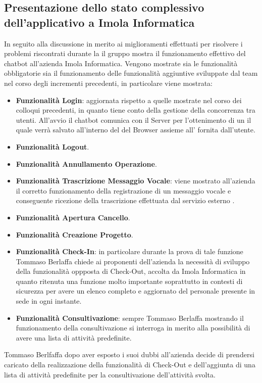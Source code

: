 \newpage
\subsection{Presentazione dello stato complessivo     dell'applicativo a Imola Informatica}
In seguito alla discussione in merito ai miglioramenti effettuati per risolvere i problemi riscontrati durante la  il gruppo mostra il funzionamento effettivo del chatbot all'azienda Imola Informatica. Vengono mostrate sia le funzionalità obbligatorie sia il funzionamento delle funzionalità aggiuntive sviluppate dal team nel corso degli incrementi precedenti, in particolare viene mostrata: 
\begin{itemize}
    \item \textbf{Funzionalità Login}: aggiornata rispetto a quelle mostrate nel corso dei colloqui precedenti, in quanto tiene conto della gestione della concorrenza tra utenti. All'avvio il chatbot comunica con il Server per l'ottenimento di un  il quale verrà salvato all'interno del  del Browser assieme all' fornita dall'utente. 
    \item \textbf{Funzionalità Logout}.
    \item \textbf{Funzionalità Annullamento Operazione}.
    \item \textbf{Funzionalità Trascrizione Messaggio Vocale}: viene mostrato all'azienda il corretto funzionamento della registrazione di un messaggio vocale e conseguente ricezione della trascrizione effettuata dal servizio esterno .
    \item \textbf{Funzionalità Apertura Cancello}.
    \item \textbf{Funzionalità Creazione Progetto}.
    \item \textbf{Funzionalità Check-In}: in particolare durante la prova di tale funzione Tommaso Berlaffa chiede ai proponenti dell'azienda la necessità di sviluppo della funzionalità oppposta di Check-Out, accolta da Imola Informatica in quanto ritenuta una funzione molto importante soprattutto in contesti di sicurezza per avere un elenco completo e aggiornato del personale presente in sede in ogni instante. 
    \item \textbf{Funzionalità Consultivazione}: sempre Tommaso Berlaffa mostrando il funzionamento della consultivazione si interroga in merito alla possibilità di avere una lista di attività predefinite. 
\end{itemize}
Tommaso Berlfaffa dopo aver esposto i suoi dubbi all'azienda decide di prendersi caricato della realizzazione della funzionalità di Check-Out e dell'aggiunta di una lista di attività predefinite per la consultivazione dell'attività svolta.


